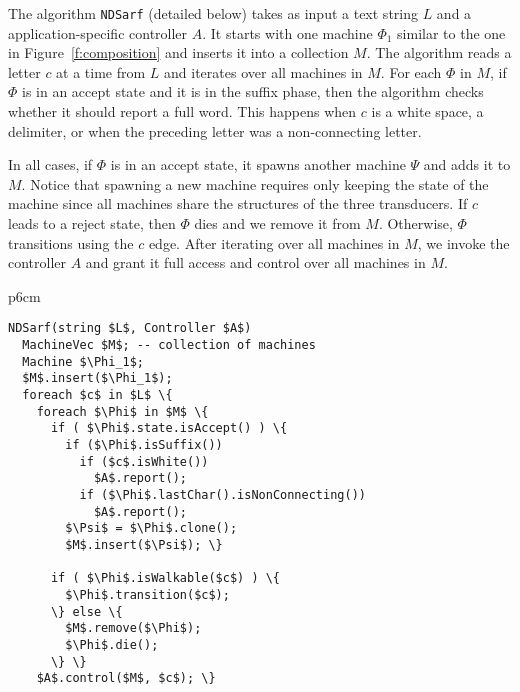 \documentclass[11pt]{article}
\newcommand{\CodeIn}[1]{{\small\texttt{#1}}}
\begin{document}
The algorithm \CodeIn{NDSarf} (detailed below)
takes as input a text string $L$ and a application-specific controller
$A$. 
It starts with one machine $\Phi_1$ similar to the one in 
Figure~\ref{f:composition} and inserts it into a collection
$M$. 
The algorithm reads a letter $c$ at a time from $L$
and iterates over all machines in $M$. 
For each $\Phi$ in $M$,
if $\Phi$ is in an accept state and it is in the suffix
phase, then the algorithm checks whether it should report
a full word. 
This happens when $c$ is a white space, a delimiter, 
or when the preceding letter %
was a non-connecting letter. 

In all cases, if $\Phi$ is in an accept state, 
it spawns another machine $\Psi$ and adds it to $M$. 
Notice that spawning a new machine requires only keeping
the state of the machine since all machines share the
structures of the three transducers.
If $c$ leads to a reject state, then $\Phi$ dies 
and we remove it from $M$. 
Otherwise, $\Phi$ transitions using the $c$ edge.
After iterating over all machines in $M$, we invoke the 
controller $A$
and grant it full access and control over
all machines in $M$. 


\begin{table}[tb]
\begin{tabular} {p{6cm}}
\begin{Verbatim}[fontsize=\relsize{-2},
frame=topline,framesep=4mm,label=\fbox{NDSarf algorithm},
commandchars=\\\{\}, codes={\catcode`$=3\catcode`_=8}]
NDSarf(string $L$, Controller $A$) 
  MachineVec $M$; -- collection of machines
  Machine $\Phi_1$;
  $M$.insert($\Phi_1$);
  foreach $c$ in $L$ \{
    foreach $\Phi$ in $M$ \{
      if ( $\Phi$.state.isAccept() ) \{
        if ($\Phi$.isSuffix())
          if ($c$.isWhite())  
            $A$.report();
          if ($\Phi$.lastChar().isNonConnecting())
            $A$.report();
        $\Psi$ = $\Phi$.clone();
        $M$.insert($\Psi$); \}

      if ( $\Phi$.isWalkable($c$) ) \{
        $\Phi$.transition($c$);
      \} else \{
        $M$.remove($\Phi$);
        $\Phi$.die();
      \} \} 
    $A$.control($M$, $c$); \}
\end{Verbatim}
\end{tabular}
\label{a:ndsarf}
\end{table}
\end{document}
